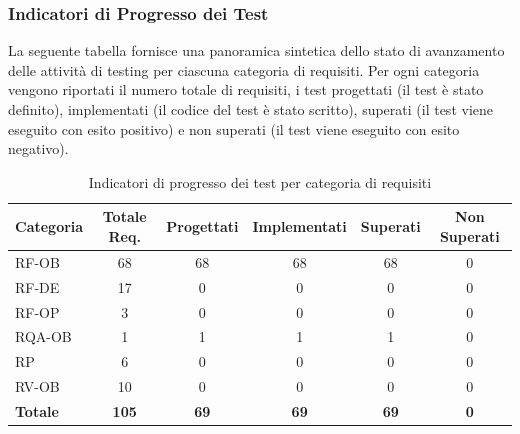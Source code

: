 \documentclass[a4paper,11pt,oneside]{scrartcl}
\begin{document}
\newpage
\subsubsection{Indicatori di Progresso dei Test}

La seguente tabella fornisce una panoramica sintetica dello stato di avanzamento delle attività di testing per ciascuna categoria di requisiti. Per ogni categoria vengono riportati il numero totale di requisiti, i test progettati (il test è stato definito), implementati (il codice del test è stato scritto), superati (il test viene eseguito con esito positivo) e non superati (il test viene eseguito con esito negativo).

\begin{table}[H]
    \centering
    \renewcommand{\arraystretch}{1.3}
    \begin{tabularx}{\textwidth}{@{}lCCCCC@{}}
        \toprule
        \textbf{Categoria} & \textbf{Totale Req.} & \textbf{Progettati} & \textbf{Implementati} & \textbf{Superati} & \textbf{Non Superati} \\
        \midrule
        RF-OB              & 68                   & 68                  & 68                    & 68                & 0                     \\
        RF-DE              & 17                   & 0                   & 0                     & 0                 & 0                     \\
        RF-OP              & 3                    & 0                   & 0                     & 0                 & 0                     \\
        RQA-OB             & 1                    & 1                   & 1                     & 1                 & 0                     \\
        RP                 & 6                    & 0                   & 0                     & 0                 & 0                     \\
        RV-OB              & 10                   & 0                   & 0                     & 0                 & 0                     \\
        \midrule
        \textbf{Totale}    & \textbf{105}         & \textbf{69}         & \textbf{69}           & \textbf{69}       & \textbf{0}            \\
        \bottomrule
    \end{tabularx}
    \caption{Indicatori di progresso dei test per categoria di requisiti}
\end{table}
\end{document}
